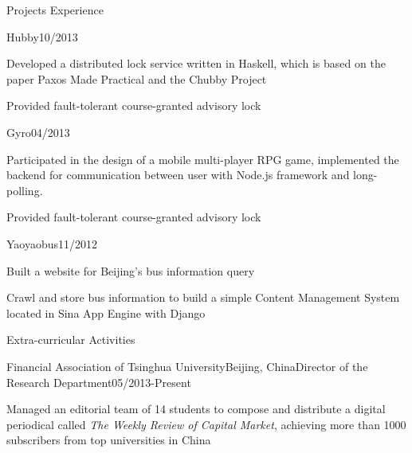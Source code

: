 \documentclass{resume} %
\begin{document}
\begin{rSection}{Projects Experience}
\begin{sSubsection}{Hubby}{10/2013}
\item Developed a distributed lock service written in Haskell, which is based on the paper Paxos Made Practical and the Chubby
Project
\item Provided fault-tolerant course-granted advisory lock
\end{sSubsection}
\vspace{-0.8em}
\begin{sSubsection}{Gyro}{04/2013}
\item Participated in the design of a mobile multi-player RPG game, implemented the backend for communication between user with Node.js framework and long-polling.
\item Provided fault-tolerant course-granted advisory lock
\end{sSubsection}
\vspace{-0.8em}
\begin{sSubsection}{Yaoyaobus}{11/2012}
\item Built a website for Beijing's bus information query
\item Crawl and store bus information to build a simple Content Management System located in Sina App Engine with Django
\end{sSubsection}
\end{rSection}
\vspace{-1.0em}

\begin{rSection}{Extra-curricular Activities}
\begin{rSubsection}{Financial Association of Tsinghua University}{Beijing, China}{Director of the Research Department}{05/2013-Present}
\vspace{-0.4em}
\item Managed an editorial team of 14 students to compose and distribute a digital periodical called \emph{The Weekly Review of Capital Market}, achieving more than 1000 subscribers from top universities in China
\end{rSubsection}
\end{rSection}
\vspace{-1.0em}
\end{document}
